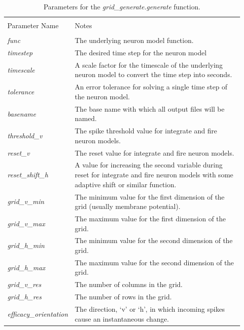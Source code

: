 \documentclass[utf8]{frontiersSCNS} %
\begin{document}
\begin{table}[ht!]
\caption{Parameters for the \textit{grid\_generate.generate} function.}
    \centering
    \begin{tabular}{|p{0.2\linewidth} | p{0.75\linewidth}|}
    \hline
    &\\
    Parameter Name & Notes \\
    \hline
    &\\
    \textit{func} & The underlying neuron model function.\\
    \textit{timestep} & The desired time step for the neuron model\\
    \textit{timescale} & A scale factor for the timescale of the underlying neuron model to convert the time step into seconds.\\
    \textit{tolerance} & An error tolerance for solving a single time step of the neuron model.\\
    \textit{basename} & The base name with which all output files will be named.\\
    \textit{threshold\_v} & The spike threshold value for integrate and fire neuron models.\\
    \textit{reset\_v} & The reset value for integrate and fire neuron models.\\
    \textit{reset\_shift\_h} & A value for increasing the second variable during reset for integrate and fire neuron models with some adaptive shift or similar function.\\
    \textit{grid\_v\_min} & The minimum value for the first dimension of the grid (usually membrane potential).\\
    \textit{grid\_v\_max} & The maximum value for the first dimension of the grid.\\
    \textit{grid\_h\_min} & The minimum value for the second dimension of the grid.\\
    \textit{grid\_h\_max} & The maximum value for the second dimension of the grid.\\
    \textit{grid\_v\_res} & The number of columns in the grid.\\
    \textit{grid\_h\_res} & The number of rows in the grid.\\
    \textit{efficacy\_orientation} & The direction, `v' or `h', in which incoming spikes cause an instantaneous change. \\
    \hline
    \end{tabular}
\label{tab:gridgenerate}
\end{table}
\end{document}
